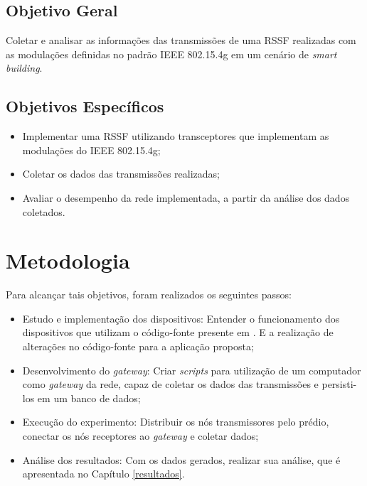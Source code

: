 \subsection{Objetivo Geral}
\label{subsec:objGeral}
Coletar e analisar as informações das transmissões de uma RSSF realizadas com as modulações definidas no padrão IEEE 802.15.4g em um cenário de \emph{smart building}.


\subsection{Objetivos Específicos}
\label{subsec:objespecificos}
\begin{itemize}
      \item Implementar uma RSSF utilizando transceptores que implementam as modulações do IEEE 802.15.4g;
      \item Coletar os dados das transmissões realizadas;
      \item Avaliar o desempenho da rede implementada, a partir da análise dos dados coletados.
\end{itemize}


\section{Metodologia}
\label{sec:metodologia}
Para alcançar tais objetivos, foram realizados os seguintes passos:


\begin{itemize}
      \item Estudo e implementação dos dispositivos: Entender o funcionamento dos dispositivos que utilizam o código-fonte presente em \cite{openmoteb-firmware}. E a realização de alterações no código-fonte para a aplicação proposta;
      \item Desenvolvimento do \emph{gateway}: Criar \emph{scripts} para utilização de um computador como \emph{gateway} da rede, capaz de coletar os dados das transmissões e persisti-los em um banco de dados;
      \item Execução do experimento: Distribuir os nós transmissores pelo prédio, conectar os nós receptores ao \emph{gateway} e coletar dados;
      \item Análise dos resultados: Com os dados gerados, realizar sua análise, que é apresentada no Capítulo \ref{resultados}.
\end{itemize}